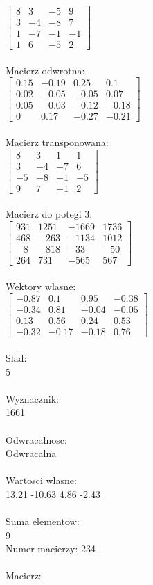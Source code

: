 \documentclass[a4paper,12pt]{article}
\begin{document}
$\begin{bmatrix} 8&3&-5&9\\3&-4&-8&7\\1&-7&-1&-1\\1&6&-5&2 \end{bmatrix}$
\\
\\
Macierz odwrotna:\\

$\begin{bmatrix} 0.15&-0.19&0.25&0.1\\0.02&-0.05&-0.05&0.07\\0.05&-0.03&-0.12&-0.18\\0&0.17&-0.27&-0.21 \end{bmatrix}$
\\
\\
Macierz transponowana:\\

$\begin{bmatrix} 8&3&1&1\\3&-4&-7&6\\-5&-8&-1&-5\\9&7&-1&2 \end{bmatrix}$
\\
\\
Macierz do potegi 3:\\

$\begin{bmatrix} 931&1251&-1669&1736\\468&-263&-1134&1012\\-8&-818&-33&-50\\264&731&-565&567 \end{bmatrix}$
\\
\\
Wektory wlasne:\\

$\begin{bmatrix} -0.87&0.1&0.95&-0.38\\-0.34&0.81&-0.04&-0.05\\0.13&0.56&0.24&0.53\\-0.32&-0.17&-0.18&0.76 \end{bmatrix}$
\\
\\
Slad:\\
5
\\
\\
Wyznacznik:\\
1661
\\
\\
Odwracalnosc:\\
Odwracalna
\\
\\
Wartosci wlasne:\\
13.21 -10.63 4.86 -2.43
\\
\\
Suma elementow:\\
9
\\
\newpage
Numer macierzy:
234
\\
\\
Macierz:\\
\end{document}
